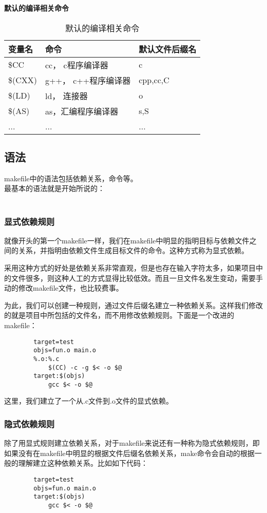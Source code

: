 \documentclass{article}
\begin{document}
\begin{CJK}{UTF8}{gbsn}
	\textbf{默认的编译相关命令}\\
	\begin{table}[!htp]
	\begin{tabular}{l|l|l}
		\hline
		变量名 & 命令 & 默认文件后缀名\\
		\hline
		\$CC & cc， c程序编译器 & c\\
		\hline
		\$(CXX) & g++， c++程序编译器 & cpp,cc,C\\
		\hline
		\$(LD) & ld， 连接器 & o\\
		\hline
		\$(AS) & as，汇编程序编译器 & s,S\\
		\hline
		... & ... & ...\\
		\hline
	\end{tabular}
		\caption{默认的编译相关命令}
	\end{table}
	\subsection{语法}
	makefile中的语法包括依赖关系，命令等。\\
	最基本的语法就是开始所说的：\\
	\\
	\subsubsection{显式依赖规则}
	就像开头的第一个makefile一样，我们在makefile中明显的指明目标与依赖文件之间的关系，并指明由依赖文件生成目标文件的命令。这种方式称为显式依赖。\par
	采用这种方式的好处是依赖关系非常直观，但是也存在输入字符太多，如果项目中的文件很多，则这种人工的方式显得比较低效。而且一旦文件名发生变动，需要手动的修改makefile文件，也比较费事。\par
	为此，我们可以创建一种规则，通过文件后缀名建立一种依赖关系。这样我们修改的就是项目中所包括的文件名，而不用修改依赖规则。下面是一个改进的makefile：\par
	\begin{verbatim}
		target=test
		objs=fun.o main.o
		%.o:%.c
		    $(CC) -c -g $< -o $@
		target:$(objs)
		    gcc $< -o $@ 
	\end{verbatim}
		这里，我们建立了一个从.c文件到.o文件的显式依赖。
	\subsubsection{隐式依赖规则}
	除了用显式规则建立依赖关系，对于makefile来说还有一种称为隐式依赖规则，即如果没有在makefile中明显的根据文件后缀名依赖关系，make命令会自动的根据一般的理解建立这种依赖关系。比如如下代码：\par
	\begin{verbatim}
		target=test
		objs=fun.o main.o
		target:$(objs)
		    gcc $< -o $@
	\end{verbatim}



\end{CJK}
\end{document}
